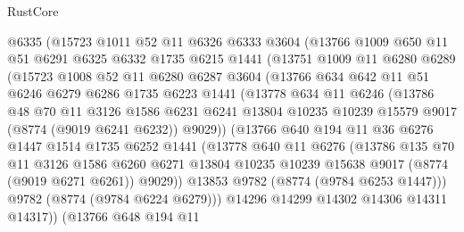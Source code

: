 \begin{lexlean}{RustCore}
\begin{coremodule}
        @6335
        (@15723
          @1011
          @52
          @11
          @6326
          @6333
          @3604
          (@13766
            @1009
            @650
            @11
            @51
            @6291
            @6325
            @6332
            @1735
            @6215
            @1441
            (@13751
              @1009
              @11
              @6280
              @6289
              (@15723
                @1008
                @52
                @11
                @6280
                @6287
                @3604
                (@13766
                  @634
                  @642
                  @11
                  @51
                  @6246
                  @6279
                  @6286
                  @1735
                  @6223
                  @1441
                  (@13778
                    @634
                    @11
                    @6246
                    (@13786
                      @48
                      @70
                      @11
                      @3126
                      @1586
                      @6231
                      @6241
                      @13804
                      @10235
                      @10239
                      @15579
                      @9017
                      (@8774 (@9019 @6241 @6232))
                      @9029))
                  (@13766
                    @640
                    @194
                    @11
                    @36
                    @6276
                    @1447
                    @1514
                    @1735
                    @6252
                    @1441
                    (@13778
                      @640
                      @11
                      @6276
                      (@13786
                        @135
                        @70
                        @11
                        @3126
                        @1586
                        @6260
                        @6271
                        @13804
                        @10235
                        @10239
                        @15638
                        @9017
                        (@8774 (@9019 @6271 @6261))
                        @9029))
                    @13853
                    @9782
                    (@8774 (@9784 @6253 @1447)))
                  @9782
                  (@8774 (@9784 @6224 @6279)))
                @14296
                @14299
                @14302
                @14306
                @14311
                @14317))
            (@13766
              @648
              @194
              @11

\end{coremodule}
\end{lexlean}
